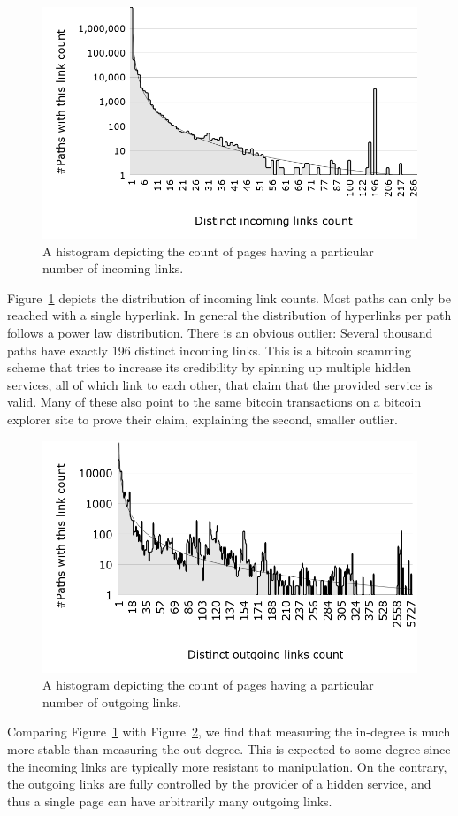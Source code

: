 \iflncs
  \begin{figure}
  \vspace{-17pt}
  \centering
  \includegraphics[trim={6cm 0 5cm 1cm}, width=0.65\linewidth]{images/DistinctIncomingLinksCount.png}
  \caption{A histogram depicting the count of pages having a particular number of incoming links.}
  \label{fig:powerLawAbnormality}
  \end{figure}
\fi
Figure~\ref{fig:powerLawAbnormality} depicts the distribution of incoming link counts. Most paths can only be reached with a single hyperlink. In general the distribution of hyperlinks per path follows a power law distribution. There is an obvious outlier: Several thousand paths have exactly 196 distinct incoming links. This is a bitcoin scamming scheme that tries to increase its credibility by spinning up multiple hidden services, all of which link to each other, that claim that the provided service is valid. Many of these also point to the same bitcoin transactions on a bitcoin explorer site to prove their claim, explaining the second, smaller outlier.

\iflncs
  \begin{figure}
      \vspace{-75pt}
      \centering
      \includegraphics[trim={6cm 0 5cm 1cm}, width=0.62\linewidth]{images/DistinctOutgoingLinksCount.png}
      \caption{A histogram depicting the count of pages having a particular number of outgoing links.}
      \label{fig:outgoingPowerLaw}
  \end{figure}
\fi
Comparing Figure~\ref{fig:powerLawAbnormality} with Figure~\ref{fig:outgoingPowerLaw}, we find that measuring the in-degree is much more stable than measuring the out-degree. This is expected to some degree since the incoming links are typically more resistant to manipulation. On the contrary, the outgoing links are fully controlled by the provider of a hidden service, and thus a single page can have arbitrarily many outgoing links.

